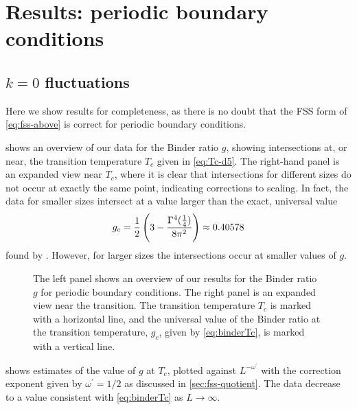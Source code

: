\section{Results: periodic boundary conditions}
\label{sec:fss-results-pbc}


\subsection{$k=0$ fluctuations}

Here we show results for completeness, as there is no doubt that the FSS form
of \cref{eq:fss-above} is correct for periodic boundary conditions.

 shows an overview of our data for the Binder ratio $g$,
showing intersections at, or near, the transition temperature $T_c$ given in
\cref{eq:Tc-d5}. The right-hand panel is an expanded view near $T_c$, where it
is clear that intersections for different sizes do not occur at exactly the
same point, indicating corrections to scaling. In fact, the data for smaller
sizes intersect at a value larger than the exact, universal value
\begin{equation}
  g_c =
  \frac{1}{2}\left(3 - \frac{\Gamma^4(\frac{1}{4})}{8\pi^2}\right) \approx
  0.40578
  \label{eq:binderTc}
\end{equation}
found by \textcite{brezin1985finite}. However, for larger sizes the
intersections occur at smaller values of $g$.
\begin{figure}
  \centering
  
  
  \caption[
    Data for the Binder ratio $g$ for the five-dimensional Ising model with
    periodic boundary conditions.
  ]
  {
    The left panel shows an overview of our results for the Binder ratio $g$
    for periodic boundary conditions. The right panel is an expanded view near
    the transition. The transition temperature $T_c$ is marked with a
    horizontal line, and the universal value of the Binder ratio at the
    transition temperature, $g_c$, given by \cref{eq:binderTc}, is marked with
    a vertical line.
  } \label{fig:binder-p}
\end{figure}
 shows estimates of the value of $g$ at $T_c$, plotted against
$L^{-\omega^{\prime}}$ with the correction exponent given by
$\omega^{\prime}=1/2$ as discussed in \cref{sec:fss-quotient}. The data
decrease to a value consistent with \cref{eq:binderTc} as $L\to\infty$.
